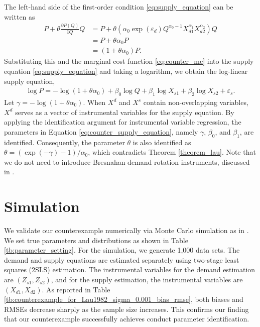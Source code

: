 \documentclass[11pt, a4paper]{article}
\theoremstyle{remark}
\begin{document}
The left-hand side of the first-order condition \eqref{eq:supply_equation} can be written as
\begin{align}
    P + \theta\frac{\partial P(Q)}{\partial Q}Q & =  P + \theta (\alpha_0 \exp(\varepsilon_{d})Q^{\alpha_0-1}X_{d1}^{\alpha_1}X_{d2}^{\alpha_2}) Q\\
    & = P + \theta \alpha_0 P\\
    &= (1 + \theta\alpha_0) P.
\end{align}
Substituting this and the marginal cost function \eqref{eq:counter_mc} into the supply equation \eqref{eq:supply_equation} and taking a logarithm, we obtain the log-linear supply equation,
\begin{align}
    \log P = - \log(1 + \theta\alpha_0) + \beta_0 \log Q + \beta_1 \log X_{s1}+\beta_2 \log X_{s2} + \varepsilon_{s}.\label{eq:counter_supply_equation}
\end{align}
Let $\gamma = - \log(1 + \theta\alpha_0)$. When $X^d$ and $X^s$ contain non-overlapping variables, $X^d$ serves as a vector of instrumental variables for the supply equation. 
By applying the identification argument for instrumental variable regression, the parameters in Equation \eqref{eq:counter_supply_equation}, namely $\gamma$, $\beta_0$, and $\beta_1$, are identified. 
Consequently, the parameter $\theta$ is also identified as $\theta = (\exp(-\gamma) - 1)/\alpha_0$, which contradicts Theorem \ref{theorem_lau}. 
Note that we do not need to introduce Bresnahan demand rotation instruments, discussed in \cite{matsumura2023resolving}.


\section{Simulation}
We validate our counterexample numerically via Monte Carlo simulation as in \cite{matsumura2023resolving}.
We set true parameters and distributions as shown in Table \ref{tb:parameter_setting}. 
For the simulation, we generate 1,000 data sets. 
The demand and supply equations are estimated separately using two-stage least squares (2SLS) estimation. The instrumental variables for the demand estimation are $(Z_{s1}, Z_{s2})$, and for the supply estimation, the instrumental variables are $(X_{d1}, X_{d2})$. 
As reported in Table \ref{tb:counterexample_for_Lau1982_sigma_0.001_bias_rmse}, both biases and RMSEs decrease sharply as the sample size increases. 
This confirms our finding that our counterexample successfully achieves conduct parameter identification.
\end{document}

